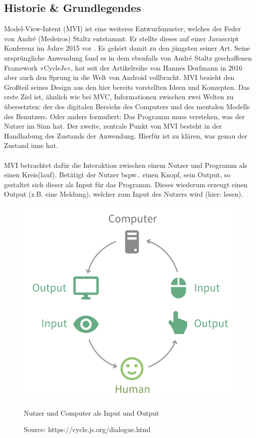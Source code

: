 \subsection{Historie \& Grundlegendes}
Model-View-Intent (MVI) ist eine weiteres Entwurfsmuster, welches der Feder von André (Medeiros) Staltz entstammt. Er stellte dieses auf einer Javascript Konferenz im Jahre 2015 vor
\cite{modelViewIntentIntroduction}. Es gehört damit zu den jüngsten seiner Art.
Seine ursprüngliche Anwendung fand es in dem ebenfalls von André Staltz geschaffenen Framework »CycleJs«, hat seit der Artikelreihe von Hannes Dorfmann in 2016
\cite{modelViewIntentOnAndroidHannesDorfmann2016}
aber auch den Sprung in die Welt von Android vollbracht. MVI bezieht den Großteil seines Design aus den hier bereits vorstellten Ideen und Konzepten. Das erste Ziel ist, ähnlich wie bei MVC, Informationen zwischen zwei Welten zu übersetzten: der des digitalen Bereichs des Computers und des mentalen Modells des Benutzers. Oder anders formuliert: Das Programm muss verstehen, was der Nutzer im Sinn hat.
Der zweite, zentrale Punkt von MVI besteht in der Handhabung des Zustands der Anwendung. Hierfür ist zu klären, was genau der Zustand inne hat.
\\
\\
MVI betrachtet dafür die Interaktion zwischen einem Nutzer und Programm als einen Kreis(lauf). Betätigt der Nutzer bspw.. einen Knopf, sein Output, so gestaltet sich dieser als Input für das Programm. Dieses wiederum erzeugt einen Output (z.B. eine Meldung), welcher zum Input des Nutzers wird (hier: lesen).
\begin{figure}[ht]
	\centering
	\includegraphics[height=0.5\textwidth]{./images/mvi-cycle}
	\caption{Nutzer und Computer als Input und Output}
	\caption*{Source: https://cycle.js.org/dialogue.html}
	\label{fig:userComputerInputOutput}
\end{figure}
\\
